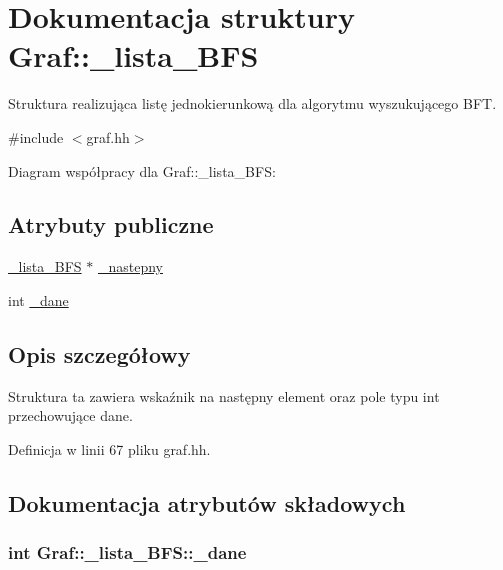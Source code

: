 \hypertarget{struct_graf_1_1__lista___b_f_s}{\section{\-Dokumentacja struktury \-Graf\-:\-:\-\_\-lista\-\_\-\-B\-F\-S}
\label{struct_graf_1_1__lista___b_f_s}
}


\-Struktura realizująca listę jednokierunkową dla algorytmu wyszukującego \-B\-F\-T.  




{\ttfamily \#include $<$graf.\-hh$>$}



\-Diagram współpracy dla \-Graf\-:\-:\-\_\-lista\-\_\-\-B\-F\-S\-:
\subsection*{\-Atrybuty publiczne}
\begin{DoxyCompactItemize}
\item 
\hyperlink{struct_graf_1_1__lista___b_f_s}{\-\_\-lista\-\_\-\-B\-F\-S} $\ast$ \hyperlink{struct_graf_1_1__lista___b_f_s_ad101a4841ac1d7c783fc24c4ef6790c1}{\-\_\-nastepny}
\item 
int \hyperlink{struct_graf_1_1__lista___b_f_s_a35804941f3d4d18c8afc8867e2204085}{\-\_\-dane}
\end{DoxyCompactItemize}


\subsection{\-Opis szczegółowy}
\-Struktura ta zawiera wskaźnik na następny element oraz pole typu int przechowujące dane. 

\-Definicja w linii 67 pliku graf.\-hh.



\subsection{\-Dokumentacja atrybutów składowych}
\hypertarget{struct_graf_1_1__lista___b_f_s_a35804941f3d4d18c8afc8867e2204085}{
\subsubsection[{\-\_\-dane}]{\setlength{\rightskip}{0pt plus 5cm}int {\bf \-Graf\-::\-\_\-lista\-\_\-\-B\-F\-S\-::\-\_\-dane}}}\label{struct_graf_1_1__lista___b_f_s_a35804941f3d4d18c8afc8867e2204085}



